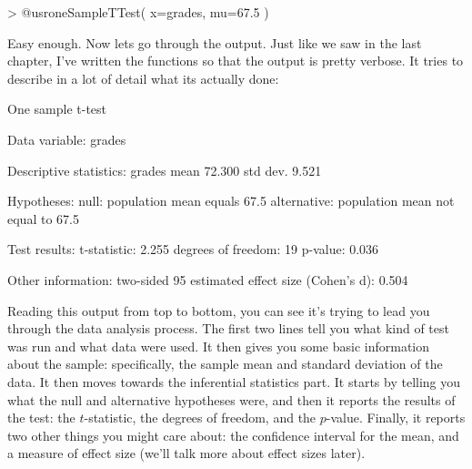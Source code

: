 \begin{rblock1}
> @usr{oneSampleTTest( x=grades, mu=67.5 )}
\end{rblock1}
Easy enough. Now lets go through the output. Just like we saw in the last chapter, I've written the functions so that the output is pretty verbose. It tries to describe in a lot of detail what its actually done:
\begin{rblock1}
   One sample t-test 

Data variable:   grades 

Descriptive statistics: 
            grades
   mean     72.300
   std dev.  9.521

Hypotheses: 
   null:        population mean equals 67.5 
   alternative: population mean not equal to 67.5 

Test results: 
   t-statistic:  2.255 
   degrees of freedom:  19 
   p-value:  0.036 

Other information: 
   two-sided 95%
   estimated effect size (Cohen's d):  0.504 
\end{rblock1}
Reading this output from top to bottom, you can see it's trying to lead you through the data analysis process. The first two lines tell you what kind of test was run and what data were used. It then gives you some basic information about the sample: specifically, the sample mean and standard deviation of the data. It then moves towards the inferential statistics part. It starts by telling you what the null and alternative hypotheses were, and then it reports the results of the test: the $t$-statistic, the degrees of freedom, and the $p$-value. Finally, it reports two other things you might care about: the confidence interval for the mean, and a measure of effect size (we'll talk more about effect sizes later). 

